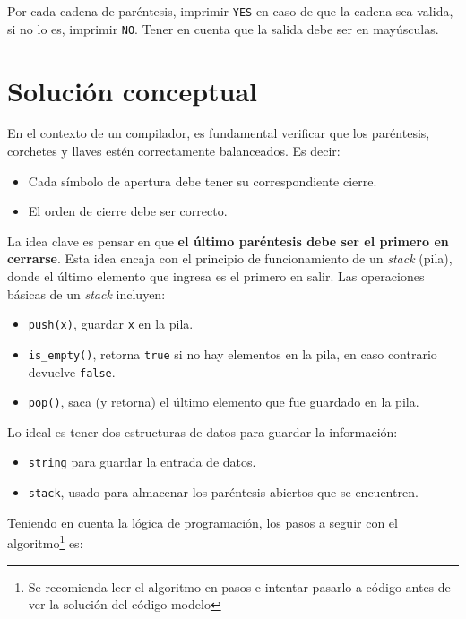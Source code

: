 \documentclass{article}
\begin{document}
Por cada cadena de paréntesis, imprimir \texttt{YES} en caso de que la cadena sea valida, si no lo es, imprimir \texttt{NO}. Tener en cuenta que la salida debe ser en mayúsculas.

\section{Solución conceptual}

En el contexto de un compilador, es fundamental verificar que los paréntesis, corchetes y llaves estén correctamente balanceados. Es decir:

\begin{itemize}
  \item Cada símbolo de apertura debe tener su correspondiente cierre.
  \item El orden de cierre debe ser correcto.
\end{itemize}

La idea clave es pensar en que \textbf{el último paréntesis debe ser el primero en cerrarse}. Esta idea encaja con el principio de funcionamiento de un \textit{stack} (pila), donde el último elemento que ingresa es el primero en salir. Las operaciones básicas de un \textit{stack} incluyen:

\begin{itemize}
  \item \texttt{push(x)}, guardar \texttt{x} en la pila.
  \item \texttt{is\_empty()}, retorna \texttt{true} si no hay elementos en la pila, en caso contrario devuelve \texttt{false}. 
  \item \texttt{pop()}, saca (y retorna) el último elemento que fue guardado en la pila. 
\end{itemize}

Lo ideal es tener dos estructuras de datos para guardar la información:

\begin{itemize}
  \item \texttt{string} para guardar la entrada de datos.
  \item \texttt{stack}, usado para almacenar los paréntesis abiertos que se encuentren.
\end{itemize}
 
Teniendo en cuenta la lógica de programación, los pasos a seguir con el algoritmo\footnote{Se recomienda leer el algoritmo en pasos e intentar pasarlo a código antes de ver la solución del código modelo} es:
\end{document}
